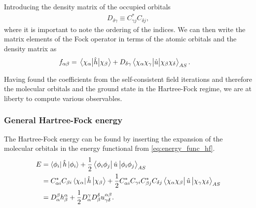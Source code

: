             Introducing the density matrix of the occupied orbitals
            \begin{align}
                D_{\delta\gamma} \equiv
                C^{*}_{\gamma j} C_{\delta j},
            \end{align}
            where it is important to note the ordering of the indices.
            We can then write the matrix elements of the Fock operator in terms
            of the atomic orbitals and the density matrix as
            \begin{align}
                f_{\alpha\beta}
                &= \mel{\chi_{\alpha}}{\hat{h}}{\chi_{\beta}}
                +
                D_{\delta\gamma}
                \mel{\chi_{\alpha}\chi_{\gamma}}{\hat{u}}{\chi_{\beta}\chi_{\delta}}_{AS}.
            \end{align}

            Having found the coefficients from the self-consistent field
            iterations and therefore the molecular orbitals and the ground state
            in the Hartree-Fock regime, we are at liberty to compute various
            observables.

            \subsubsection{General Hartree-Fock energy}
                The Hartree-Fock energy can be found by inserting the expansion
                of the molecular orbitals in the energy functional from
                \autoref{eq:energy_func_hf}.
                \begin{align}
                    E
                    &= \bra{\phi_i}\hat{h}\ket{\phi_i}
                    + \frac{1}{2}\bra{\phi_i\phi_j}\hat{u}\ket{\phi_i\phi_j}_{AS}
                    \\
                    &=
                    C^{*}_{\alpha i} C_{\beta i}
                    \bra{\chi_{\alpha}}\hat{h}\ket{\chi_{\beta}}
                    + \frac{1}{2}
                    C^{*}_{\alpha i} C_{\gamma i}
                    C^{*}_{\beta j} C_{\delta j}
                    \bra{\chi_{\alpha}\chi_{\beta}}\hat{u}
                    \ket{\chi_{\gamma}\chi_{\delta}}_{AS}
                    \\
                    &=
                    D^{\beta}_{\alpha} h^{\alpha}_{\beta}
                    + \frac{1}{2}
                    D^{\gamma}_{\alpha} D^{\delta}_{\beta}
                    u^{\alpha \beta}_{\gamma \delta}.
                    \label{eq:general-hartree-fock-energy}
                \end{align}


